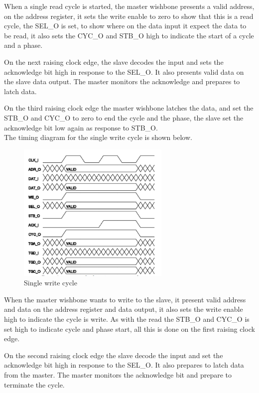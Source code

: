 When a single read cycle is started, the master wishbone presents a valid address, on the address register, it sets the write enable to zero to show that this is a read cycle, the SEL\_O is set, to show where on the data input it expect the data to be read, it also sets the CYC\_O and STB\_O high to indicate the start of a cycle and a phase.

On the next raising clock edge, the slave decodes the input and sets the acknowledge bit high in response to the SEL\_O. It also presents valid data on the slave data output. The master monitors the acknowledge and prepares to latch data.


On the third raising clock edge the master wishbone latches the data, and set the STB\_O and CYC\_O to zero to end the cycle and the phase, the slave set the acknowledge bit low again as response to STB\_O.\\
The timing diagram for the single write cycle is shown below.
\begin{figure}[H]
	\begin{centering}
		 \includegraphics[width=0.65\textwidth]{content/appendix/eudp/images/wb_single_write.png}
		\caption{Single write cycle}
	\end{centering}
\end{figure}
When the master wishbone wants to write to the slave, it present valid address and data on the address register and data output, it also sets the write enable high to indicate the cycle is write. As with the read the STB\_O and CYC\_O is set high to indicate cycle and phase start, all this is done on the first raising clock edge.

On the second raising clock edge the slave decode the input and set the acknowledge bit high in response to the SEL\_O. It also prepares to latch data from the master. The master monitors the acknowledge bit and prepare to terminate the cycle.

